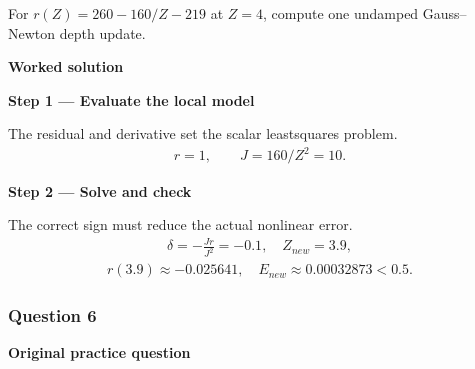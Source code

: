 \documentclass[letterpaper,11pt,english,openany,oneside]{jupyterBook}
\begin{document}
\sphinxAtStartPar
For \(r(Z)=260-160/Z-219\) at \(Z=4\), compute one undamped Gauss–Newton depth update.

\par\medskip

\par\medskip
\textbf{Worked solution}\par\smallskip

\par\medskip{}
{\color{QuizStepRed}\bfseries Step 1 — Evaluate the local model}\par\smallskip

\sphinxAtStartPar
{} The residual and derivative set the scalar least\sphinxhyphen{}squares problem.
{\color{QuizMathBlue} \begin{equation*}
\begin{split}r=1,\qquad J=160/Z^2=10.\end{split}
\end{equation*}}
\par

\par\medskip{}
{\color{QuizStepRed}\bfseries Step 2 — Solve and check}\par\smallskip

\sphinxAtStartPar
{} The correct sign must reduce the actual nonlinear error.
{\color{QuizMathBlue} \begin{equation*}
\begin{split}\delta=-\frac{Jr}{J^2}=-0.1,\quad Z_{new}=3.9,\end{split}
\end{equation*}}{\color{QuizMathBlue} \begin{equation*}
\begin{split}r(3.9)\approx-0.025641,\quad E_{new}\approx0.00032873<0.5.\end{split}
\end{equation*}}
\par

\par\medskip


\subsubsection{Question 6}
\label{\detokenize{lectures/lecture06/tldr:question-6}}
\par\medskip\textbf{Original practice question}\par\smallskip
\end{document}

